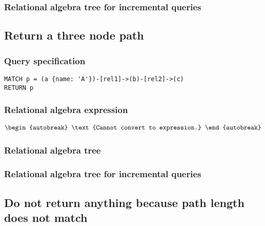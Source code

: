 \subsubsection*{Relational algebra tree for incremental queries}


\subsection{Return a three node path}

\subsubsection*{Query specification}

\begin{lstlisting}
MATCH p = (a {name: 'A'})-[rel1]->(b)-[rel2]->(c)
RETURN p
\end{lstlisting}

\subsubsection*{Relational algebra expression}

\begin{align*}
\begin{autobreak}
\text{Cannot convert to expression.}
\end{autobreak}
\end{align*}

\subsubsection*{Relational algebra tree}


\subsubsection*{Relational algebra tree for incremental queries}


\subsection{Do not return anything because path length does not match}

